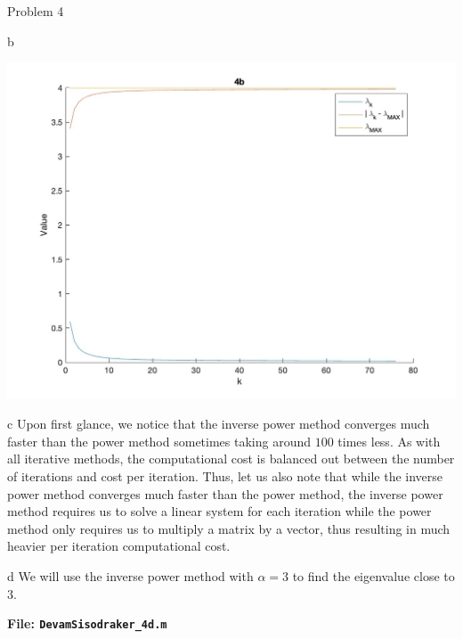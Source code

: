 \begin{section}{Problem 4}
\begin{solution}{b}
        \begin{mdframed}
            \includegraphics[scale=0.33]{DevamSisodraker_4b.jpg}
        \end{mdframed}
    \end{solution}
    
    \newpage
    
    \begin{solution}{c}
        Upon first glance, we notice that the inverse power method converges much faster than the power method sometimes taking around $100$ times less. As with all iterative methods, the computational cost is balanced out between the number of iterations and cost per iteration. Thus, let us also note that while the inverse power method converges much faster than the power method, the inverse power method requires us to solve a linear system for each iteration while the power method only requires us to multiply a matrix by a vector, thus resulting in much heavier per iteration computational cost.
    \end{solution}
    
    \newpage
    
    \begin{solution}{d}
        We will use the inverse power method with $\alpha = 3$ to find the eigenvalue close to $3$.

        \continued

        \begin{mdframed}
            \footnotesize
            \textbf{File: {\tt DevamSisodraker\_4d.m}}
            \inputminted{matlab}{DevamSisodraker_4d.m}
            \normalfont
        \end{mdframed}
        

\end{solution}
\end{section}
